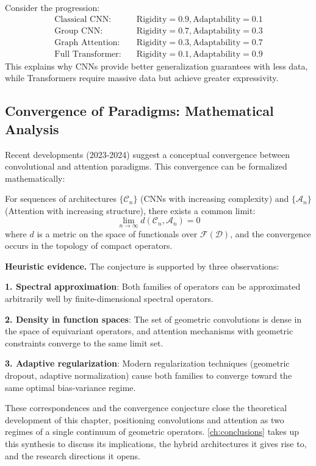 \begin{example}\label{ex:analisis_espectro}
Consider the progression:
\begin{align}
    \text{Classical CNN}: &\quad \text{Rigidity} = 0.9, \text{Adaptability} = 0.1 \\
    \text{Group CNN}: &\quad \text{Rigidity} = 0.7, \text{Adaptability} = 0.3 \\
    \text{Graph Attention}: &\quad \text{Rigidity} = 0.3, \text{Adaptability} = 0.7 \\
    \text{Full Transformer}: &\quad \text{Rigidity} = 0.1, \text{Adaptability} = 0.9
\end{align}
This explains why CNNs provide better generalization guarantees with less data, while Transformers require massive data but achieve greater expressivity.
\end{example}

\subsection{Convergence of Paradigms: Mathematical Analysis}\label{subsec:convergencia_paradigmas}

Recent developments (2023-2024) suggest a conceptual convergence between convolutional and attention paradigms. This convergence can be formalized mathematically:

\begin{conjecture}\label{conj:convergencia_cnn_attention}
For sequences of architectures $\{\mathcal{C}_n\}$ (CNNs with increasing complexity) and $\{\mathcal{A}_n\}$ (Attention with increasing structure), there exists a common limit:
\begin{equation}
    \lim_{n \to \infty} d(\mathcal{C}_n, \mathcal{A}_n) = 0
\end{equation}
where $d$ is a metric on the space of functionals over $\mathcal{F}(\mathcal{D})$, and the convergence occurs in the topology of compact operators.
\end{conjecture}

\textbf{Heuristic evidence.} The conjecture is supported by three observations:

\textbf{1. Spectral approximation}: Both families of operators can be approximated arbitrarily well by finite-dimensional spectral operators.

\textbf{2. Density in function spaces}: The set of geometric convolutions is dense in the space of equivariant operators, and attention mechanisms with geometric constraints converge to the same limit set.

\textbf{3. Adaptive regularization}: Modern regularization techniques (geometric dropout, adaptive normalization) cause both families to converge toward the same optimal bias-variance regime.

These correspondences and the convergence conjecture close the theoretical development of this chapter, positioning convolutions and attention as two regimes of a single continuum of geometric operators. \autoref{ch:conclusions} takes up this synthesis to discuss its implications, the hybrid architectures it gives rise to, and the research directions it opens.
